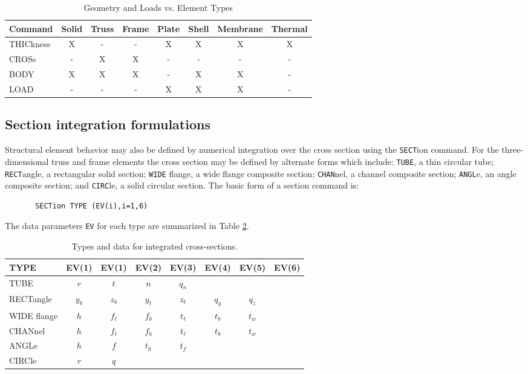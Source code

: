 \begin{table}[ht!]
\begin{center}
\begin{tabular}{| l | c | c | c | c | c | c | c |} \hline
Command & Solid & Truss & Frame & Plate & Shell & Membrane & Thermal \\ \hline
THICkness     & X & - & - & X & X & X & X \\
CROSs         & - & X & X & - & - & - & - \\ \hline
BODY          & X & X & X & - & X & X & - \\
LOAD          & - & - & - & X & X & X & - \\ \hline
\end{tabular}
\end{center}
\caption{Geometry and Loads vs. Element Types}
\label{tab133b}
\end{table}

\subsection{Section integration formulations}

Structural element behavior may also be defined by numerical integration
over the cross section using the {\tt SECT}ion command.
For the three-dimensional truss and frame elements
the cross section may be defined by alternate forms which include: {\tt TUBE},
a thin circular tube; {\tt RECT}angle, a rectangular solid section; {\tt WIDE}
flange, a wide flange composite section; {\tt CHAN}nel, a channel composite
section; {\tt ANGL}e, an angle composite section; and {\tt CIRC}le, a solid
circular section.  The basic form of a section command is:

\begin{verbatim}
       SECTion TYPE (EV(i),i=1,6)
\end{verbatim}
The data parameters {\tt EV} for each type are summarized in
Table \ref{tab133c}.

\begin{table}[ht!]
\begin{center}
\begin{tabular}{| l | c | c | c | c | c | c | c |} \hline
TYPE & EV(1) & EV(1) & EV(2) & EV(3) & EV(4) & EV(5) & EV(6) \\ \hline
TUBE & $r$   & $t$   & $n$   & $q_n$ &   &   &  \\
RECTangle & $y_b$ & $z_b$ & $y_t$ & $z_t$ & $q_y$ & $q_z$ & \\
WIDE flange & $h$ & $f_t$ & $f_b$ & $t_t$ & $t_b$ & $t_w$ & \\
CHANnel     & $h$ & $f_t$ & $f_b$ & $t_t$ & $t_b$ & $t_w$ & \\
ANGLe       & $h$ & $f$ & $t_h$ & $t_f$ &   &   &   \\
CIRCle      & $r$ & $q$ &   &   &  &  & \\ \hline
\end{tabular}
\end{center}
\caption{Types and data for integrated cross-sections.}
\label{tab133c}
\end{table}

